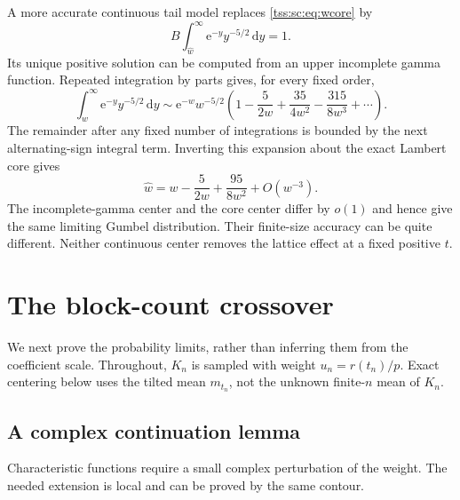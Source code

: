 \documentclass[11pt]{article}
\theoremstyle{remark}\newtheorem{remark}[theorem]{Remark}
\theoremstyle{definition}\newtheorem{definition}[theorem]{Definition}
\newcommand{\dd}{\mathrm d}
\newcommand{\e}{\mathrm e}
\begin{document}
A more accurate continuous tail model replaces \eqref{tss:sc:eq:wcore} by
\begin{equation}\label{tss:sc:eq:wrefined}
 B\int_{\widehat w}^\infty\e^{-y}y^{-5/2}\,\dd y=1.
\end{equation}
Its unique positive solution can be computed from an upper incomplete gamma function. Repeated integration by parts gives, for every fixed order,
\begin{equation}\label{tss:sc:eq:gammatail}
 \int_w^\infty\e^{-y}y^{-5/2}\,\dd y
 \sim\e^{-w}w^{-5/2}
 \left(1-\frac5{2w}+\frac{35}{4w^2}-\frac{315}{8w^3}+\cdots\right).
\end{equation}
The remainder after any fixed number of integrations is bounded by the next alternating-sign integral term. Inverting this expansion about the exact Lambert core gives
\begin{equation}\label{tss:sc:eq:wshift}
 \widehat w=w-\frac5{2w}+\frac{95}{8w^2}+O(w^{-3}).
\end{equation}
The incomplete-gamma center and the core center differ by $o(1)$ and hence give the same limiting Gumbel distribution. Their finite-size accuracy can be quite different. Neither continuous center removes the lattice effect at a fixed positive $t$.

\section{The block-count crossover}
\label{tss:sc:sec:count}

We next prove the probability limits, rather than inferring them from the coefficient scale. Throughout, $K_n$ is sampled with weight $u_n=r(t_n)/p$. Exact centering below uses the tilted mean $m_{t_n}$, not the unknown finite-$n$ mean of $K_n$.

\subsection{A complex continuation lemma}
Characteristic functions require a small complex perturbation of the weight. The needed extension is local and can be proved by the same contour.
\end{document}
